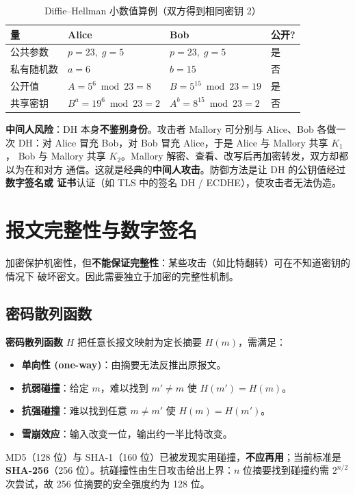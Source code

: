 \begin{table}[H]
\centering
\renewcommand{\arraystretch}{1.3}
\begin{tabulary}{\textwidth}{@{}L L L L@{}}
\toprule
\textbf{量} & \textbf{Alice} & \textbf{Bob} & \textbf{公开?} \\
\midrule
公共参数 & $p=23,\;g=5$ & $p=23,\;g=5$ & 是 \\
私有随机数 & $a=6$ & $b=15$ & 否 \\
公开值 & $A=5^{6}\bmod23=8$ & $B=5^{15}\bmod23=19$ & 是 \\
共享密钥 & $B^{a}=19^{6}\bmod23=2$ & $A^{b}=8^{15}\bmod23=2$ & 否 \\
\bottomrule
\end{tabulary}
\caption{Diffie--Hellman 小数值算例（双方得到相同密钥 2）}
\label{tab:dh}
\end{table}

\textbf{中间人风险}：DH 本身\textbf{不鉴别身份}。攻击者 Mallory 可分别与 Alice、Bob
各做一次 DH：对 Alice 冒充 Bob，对 Bob 冒充 Alice，于是 Alice 与 Mallory 共享 $K_1$，
Bob 与 Mallory 共享 $K_2$。Mallory 解密、查看、改写后再加密转发，双方却都以为在和对方
通信。这就是经典的\textbf{中间人攻击}。防御方法是让 DH 的公钥值经过\textbf{数字签名或
证书}认证（如 TLS 中的签名 DH / ECDHE），使攻击者无法伪造。

\section{报文完整性与数字签名}

加密保护机密性，但\textbf{不能保证完整性}：某些攻击（如比特翻转）可在不知道密钥的情况下
破坏密文。因此需要独立于加密的完整性机制。

\subsection{密码散列函数}

\textbf{密码散列函数} $H$ 把任意长报文映射为定长摘要 $H(m)$，需满足：
\begin{itemize}
    \item \textbf{单向性 (one-way)}：由摘要无法反推出原报文。
    \item \textbf{抗弱碰撞}：给定 $m$，难以找到 $m'\neq m$ 使 $H(m')=H(m)$。
    \item \textbf{抗强碰撞}：难以找到任意 $m\neq m'$ 使 $H(m)=H(m')$。
    \item \textbf{雪崩效应}：输入改变一位，输出约一半比特改变。
\end{itemize}
MD5（128 位）与 SHA-1（160 位）已被发现实用碰撞，\textbf{不应再用}；当前标准是
\textbf{SHA-256}（256 位）。抗碰撞性由生日攻击给出上界：$n$ 位摘要找到碰撞约需
$2^{n/2}$ 次尝试，故 256 位摘要的安全强度约为 128 位。

